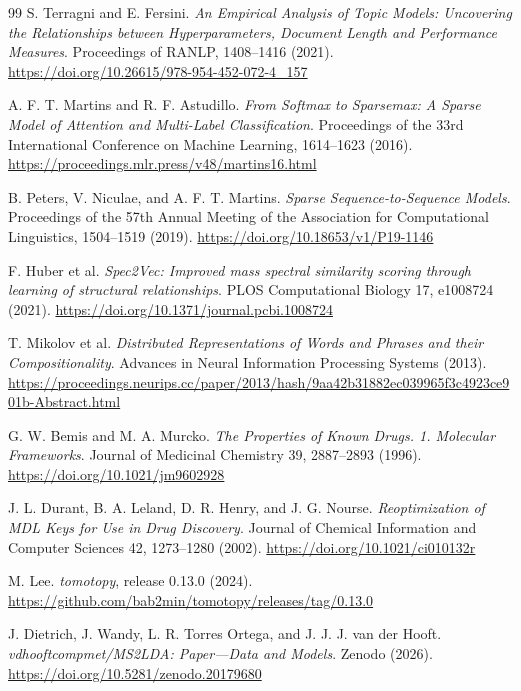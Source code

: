 \documentclass[10pt,a4paper]{article}
\begin{document}
\begin{thebibliography}{99}
S. Terragni and E. Fersini. \emph{An Empirical Analysis of Topic Models:
Uncovering the Relationships between Hyperparameters, Document Length and
Performance Measures}. Proceedings of RANLP, 1408--1416 (2021).
\url{https://doi.org/10.26615/978-954-452-072-4_157}

A. F. T. Martins and R. F. Astudillo. \emph{From Softmax to Sparsemax: A Sparse
Model of Attention and Multi-Label Classification}. Proceedings of the 33rd
International Conference on Machine Learning, 1614--1623 (2016).
\url{https://proceedings.mlr.press/v48/martins16.html}

B. Peters, V. Niculae, and A. F. T. Martins. \emph{Sparse
Sequence-to-Sequence Models}. Proceedings of the 57th Annual Meeting of the
Association for Computational Linguistics, 1504--1519 (2019).
\url{https://doi.org/10.18653/v1/P19-1146}

F. Huber et al. \emph{Spec2Vec: Improved mass spectral similarity scoring
through learning of structural relationships}. PLOS Computational Biology 17,
e1008724 (2021).
\url{https://doi.org/10.1371/journal.pcbi.1008724}

T. Mikolov et al. \emph{Distributed Representations of Words and Phrases and
their Compositionality}. Advances in Neural Information Processing Systems
(2013).
\url{https://proceedings.neurips.cc/paper/2013/hash/9aa42b31882ec039965f3c4923ce901b-Abstract.html}

G. W. Bemis and M. A. Murcko. \emph{The Properties of Known Drugs. 1.
Molecular Frameworks}. Journal of Medicinal Chemistry 39, 2887--2893 (1996).
\url{https://doi.org/10.1021/jm9602928}

J. L. Durant, B. A. Leland, D. R. Henry, and J. G. Nourse.
\emph{Reoptimization of MDL Keys for Use in Drug Discovery}.
Journal of Chemical Information and Computer Sciences 42,
1273--1280 (2002).
\url{https://doi.org/10.1021/ci010132r}

M. Lee. \emph{tomotopy}, release 0.13.0 (2024).
\url{https://github.com/bab2min/tomotopy/releases/tag/0.13.0}

J. Dietrich, J. Wandy, L. R. Torres Ortega, and J. J. J. van der Hooft.
\emph{vdhooftcompmet/MS2LDA: Paper---Data and Models}. Zenodo (2026).
\url{https://doi.org/10.5281/zenodo.20179680}

\end{thebibliography}
\end{document}
